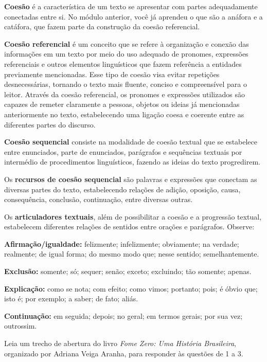 \begin{itemize}
\begin{itemize}
{\begin{itemize}
\begin{itemize}
{\textbf{Coesão} é a característica de um texto se apresentar com partes
adequadamente conectadas entre si. No módulo anterior, você já aprendeu
o que são a anáfora e a catáfora, que fazem parte da construção da
coesão referencial.

\textbf{Coesão referencial} é um conceito que se refere à organização e
conexão das informações em um texto por meio do uso adequado de
pronomes, expressões referenciais e outros elementos linguísticos que
fazem referência a entidades previamente mencionadas. Esse tipo de
coesão visa evitar repetições desnecessárias, tornando o texto mais
fluente, conciso e compreensível para o leitor. Através da coesão
referencial, os pronomes e expressões utilizados são capazes de remeter
claramente a pessoas, objetos ou ideias já mencionadas anteriormente no
texto, estabelecendo uma ligação coesa e coerente entre as diferentes
partes do discurso.

\textbf{Coesão sequencial} consiste na modalidade de coesão textual que
se estabelece entre enunciados, parte de enunciados, parágrafos e
sequências textuais por intermédio de procedimentos linguísticos,
fazendo as ideias do texto progredirem.

Os \textbf{recursos de coesão sequencial} são palavras e expressões que
conectam as diversas partes do texto, estabelecendo relações de adição,
oposição, causa, consequência, conclusão, continuação, entre diversas
outras.

Os \textbf{articuladores textuais}, além de possibilitar a coesão e a
progressão textual, estabelecem diferentes relações de sentidos entre
orações e parágrafos. Observe:

\textbf{Afirmação/igualdade:} felizmente; infelizmente; obviamente; na
verdade; realmente; de igual forma; do mesmo modo que; nesse sentido;
semelhantemente.

\textbf{Exclusão:} somente; só; sequer; senão; exceto; excluindo; tão
somente; apenas.

\textbf{Explicação:} como se nota; com efeito; como vimos; portanto;
pois; é óbvio que; isto é; por exemplo; a saber; de fato; aliás.

\textbf{Continuação:} em seguida; depois; no geral; em termos gerais;
por sua vez; outrossim.
}


Leia um trecho de abertura do livro \emph{Fome Zero: Uma História
Brasileira}, organizado por Adriana Veiga Aranha, para responder às
questões de 1 a 3.


\end{itemize}
\end{itemize}}
\end{itemize}
\end{itemize}
